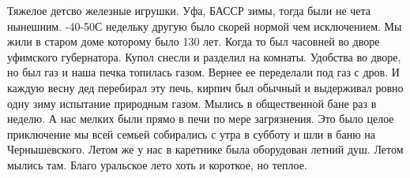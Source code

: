 \begin{itemize}

Тяжелое детсво железные игрушки. Уфа, БАССР зимы, тогда были не чета нынешним.
-40-50С недельку другую было скорей нормой чем исключением. Мы жили в старом
доме которому было 130 лет. Когда то был часовней во дворе уфимского
губернатора. Купол снесли и разделил на комнаты. Удобства во дворе, но был газ
и наша печка топилась газом. Вернее ее переделали под газ с дров. И каждую
весну дед перебирал эту печь, кирпич был обычный и выдерживал ровно одну зиму
испытание природным газом. Мылись в общественной бане раз в неделю. А нас
мелких были прямо в печи по мере загрязнения. Это было целое приключение мы
всей семьей собирались с утра в субботу и шли в баню на Чернышевского. Летом же
у нас в каретнике была оборудован летний душ. Летом мылись там. Благо уральское
лето хоть и короткое, но теплое.

\end{itemize} %
